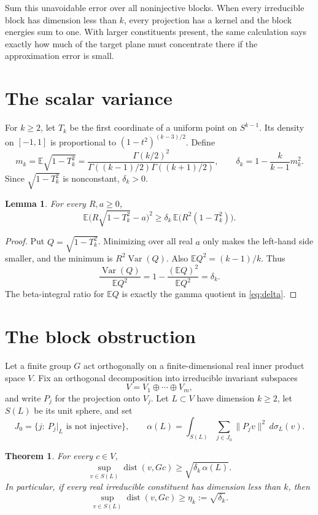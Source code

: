 \documentclass[11pt]{article}
\newtheorem{theorem}{Theorem}
\newtheorem{lemma}{Lemma}
\newcommand{\E}{\mathbb E}
\newcommand{\dist}{\operatorname{dist}}
\begin{document}
Sum this unavoidable error over all noninjective blocks.  When every
irreducible block has dimension less than $k$, every projection has a kernel
and the block energies sum to one.  With larger constituents present, the same
calculation says exactly how much of the target plane must concentrate there
if the approximation error is small.

\section{The scalar variance}

For $k\ge2$, let $T_k$ be the first coordinate of a uniform point on
$S^{k-1}$.  Its density on $[-1,1]$ is proportional to
$(1-t^2)^{(k-3)/2}$. Define
\begin{equation}\label{eq:delta}
 m_k=\E\sqrt{1-T_k^2}
 =\frac{\Gamma(k/2)^2}
 {\Gamma((k-1)/2)\Gamma((k+1)/2)},
 \qquad
 \delta_k=1-\frac{k}{k-1}m_k^2.
\end{equation}
Since $\sqrt{1-T_k^2}$ is nonconstant, $\delta_k>0$.

\begin{lemma}\label{lem:scalar}
For every $R,a\ge0$,
\[
 \E\bigl(R\sqrt{1-T_k^2}-a\bigr)^2
 \ge \delta_k\,\E\bigl(R^2(1-T_k^2)\bigr).
\]
\end{lemma}

\begin{proof}
Put $Q=\sqrt{1-T_k^2}$.  Minimizing over all real $a$ only makes the
left-hand side smaller, and the minimum is $R^2\operatorname{Var}(Q)$.  Also
$\E Q^2=(k-1)/k$.  Thus
\[
 \frac{\operatorname{Var}(Q)}{\E Q^2}
 =1-\frac{(\E Q)^2}{\E Q^2}=\delta_k.
\]
The beta-integral ratio for $\E Q$ is exactly the gamma quotient in
\eqref{eq:delta}.
\end{proof}

\section{The block obstruction}

Let a finite group $G$ act orthogonally on a finite-dimensional real inner
product space $V$. Fix an orthogonal decomposition into irreducible invariant
subspaces
\[
 V=V_1\oplus\cdots\oplus V_m,
\]
and write $P_j$ for the projection onto $V_j$. Let $L\subset V$ have
dimension $k\ge2$, let $S(L)$ be its unit sphere, and set
\[
 J_0=\{j:\ P_j|_L\text{ is not injective}\},\qquad
 \alpha(L)=\int_{S(L)}\sum_{j\in J_0}\|P_jv\|^2\,d\sigma_L(v).
\]

\begin{theorem}\label{thm:block}
For every $c\in V$,
\begin{equation}\label{eq:mainbound}
 \sup_{v\in S(L)}\dist(v,Gc)
 \ge \sqrt{\delta_k\,\alpha(L)}.
\end{equation}
In particular, if every real irreducible constituent has dimension less than
$k$, then
\begin{equation}\label{eq:universal}
 \sup_{v\in S(L)}\dist(v,Gc)\ge\eta_k:=\sqrt{\delta_k}.
\end{equation}
\end{theorem}
\end{document}
